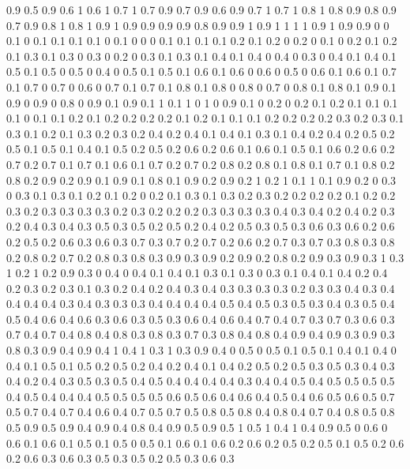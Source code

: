 0.9 0.5
0.9 0.6
1 0.6
1 0.7
1 0.7
0.9 0.7
0.9 0.6
0.9 0.7
1 0.7
1 0.8
1 0.8
0.9 0.8
0.9 0.7
0.9 0.8
1 0.8
1 0.9
1 0.9
0.9 0.9
0.9 0.8
0.9 0.9
1 0.9
1 1
1 1
0.9 1
0.9 0.9
0 0
0.1 0
0.1 0.1
0.1 0.1
0 0.1
0 0
0 0.1
0.1 0.1
0.1 0.2
0.1 0.2
0 0.2
0 0.1
0 0.2
0.1 0.2
0.1 0.3
0.1 0.3
0 0.3
0 0.2
0 0.3
0.1 0.3
0.1 0.4
0.1 0.4
0 0.4
0 0.3
0 0.4
0.1 0.4
0.1 0.5
0.1 0.5
0 0.5
0 0.4
0 0.5
0.1 0.5
0.1 0.6
0.1 0.6
0 0.6
0 0.5
0 0.6
0.1 0.6
0.1 0.7
0.1 0.7
0 0.7
0 0.6
0 0.7
0.1 0.7
0.1 0.8
0.1 0.8
0 0.8
0 0.7
0 0.8
0.1 0.8
0.1 0.9
0.1 0.9
0 0.9
0 0.8
0 0.9
0.1 0.9
0.1 1
0.1 1
0 1
0 0.9
0.1 0
0.2 0
0.2 0.1
0.2 0.1
0.1 0.1
0.1 0
0.1 0.1
0.2 0.1
0.2 0.2
0.2 0.2
0.1 0.2
0.1 0.1
0.1 0.2
0.2 0.2
0.2 0.3
0.2 0.3
0.1 0.3
0.1 0.2
0.1 0.3
0.2 0.3
0.2 0.4
0.2 0.4
0.1 0.4
0.1 0.3
0.1 0.4
0.2 0.4
0.2 0.5
0.2 0.5
0.1 0.5
0.1 0.4
0.1 0.5
0.2 0.5
0.2 0.6
0.2 0.6
0.1 0.6
0.1 0.5
0.1 0.6
0.2 0.6
0.2 0.7
0.2 0.7
0.1 0.7
0.1 0.6
0.1 0.7
0.2 0.7
0.2 0.8
0.2 0.8
0.1 0.8
0.1 0.7
0.1 0.8
0.2 0.8
0.2 0.9
0.2 0.9
0.1 0.9
0.1 0.8
0.1 0.9
0.2 0.9
0.2 1
0.2 1
0.1 1
0.1 0.9
0.2 0
0.3 0
0.3 0.1
0.3 0.1
0.2 0.1
0.2 0
0.2 0.1
0.3 0.1
0.3 0.2
0.3 0.2
0.2 0.2
0.2 0.1
0.2 0.2
0.3 0.2
0.3 0.3
0.3 0.3
0.2 0.3
0.2 0.2
0.2 0.3
0.3 0.3
0.3 0.4
0.3 0.4
0.2 0.4
0.2 0.3
0.2 0.4
0.3 0.4
0.3 0.5
0.3 0.5
0.2 0.5
0.2 0.4
0.2 0.5
0.3 0.5
0.3 0.6
0.3 0.6
0.2 0.6
0.2 0.5
0.2 0.6
0.3 0.6
0.3 0.7
0.3 0.7
0.2 0.7
0.2 0.6
0.2 0.7
0.3 0.7
0.3 0.8
0.3 0.8
0.2 0.8
0.2 0.7
0.2 0.8
0.3 0.8
0.3 0.9
0.3 0.9
0.2 0.9
0.2 0.8
0.2 0.9
0.3 0.9
0.3 1
0.3 1
0.2 1
0.2 0.9
0.3 0
0.4 0
0.4 0.1
0.4 0.1
0.3 0.1
0.3 0
0.3 0.1
0.4 0.1
0.4 0.2
0.4 0.2
0.3 0.2
0.3 0.1
0.3 0.2
0.4 0.2
0.4 0.3
0.4 0.3
0.3 0.3
0.3 0.2
0.3 0.3
0.4 0.3
0.4 0.4
0.4 0.4
0.3 0.4
0.3 0.3
0.3 0.4
0.4 0.4
0.4 0.5
0.4 0.5
0.3 0.5
0.3 0.4
0.3 0.5
0.4 0.5
0.4 0.6
0.4 0.6
0.3 0.6
0.3 0.5
0.3 0.6
0.4 0.6
0.4 0.7
0.4 0.7
0.3 0.7
0.3 0.6
0.3 0.7
0.4 0.7
0.4 0.8
0.4 0.8
0.3 0.8
0.3 0.7
0.3 0.8
0.4 0.8
0.4 0.9
0.4 0.9
0.3 0.9
0.3 0.8
0.3 0.9
0.4 0.9
0.4 1
0.4 1
0.3 1
0.3 0.9
0.4 0
0.5 0
0.5 0.1
0.5 0.1
0.4 0.1
0.4 0
0.4 0.1
0.5 0.1
0.5 0.2
0.5 0.2
0.4 0.2
0.4 0.1
0.4 0.2
0.5 0.2
0.5 0.3
0.5 0.3
0.4 0.3
0.4 0.2
0.4 0.3
0.5 0.3
0.5 0.4
0.5 0.4
0.4 0.4
0.4 0.3
0.4 0.4
0.5 0.4
0.5 0.5
0.5 0.5
0.4 0.5
0.4 0.4
0.4 0.5
0.5 0.5
0.5 0.6
0.5 0.6
0.4 0.6
0.4 0.5
0.4 0.6
0.5 0.6
0.5 0.7
0.5 0.7
0.4 0.7
0.4 0.6
0.4 0.7
0.5 0.7
0.5 0.8
0.5 0.8
0.4 0.8
0.4 0.7
0.4 0.8
0.5 0.8
0.5 0.9
0.5 0.9
0.4 0.9
0.4 0.8
0.4 0.9
0.5 0.9
0.5 1
0.5 1
0.4 1
0.4 0.9
0.5 0
0.6 0
0.6 0.1
0.6 0.1
0.5 0.1
0.5 0
0.5 0.1
0.6 0.1
0.6 0.2
0.6 0.2
0.5 0.2
0.5 0.1
0.5 0.2
0.6 0.2
0.6 0.3
0.6 0.3
0.5 0.3
0.5 0.2
0.5 0.3
0.6 0.3
